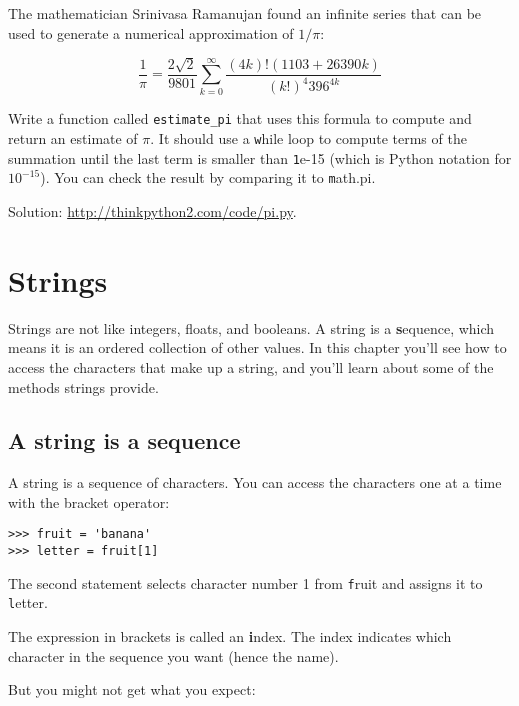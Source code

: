 \documentclass[
DIV=11,
fontsize=12,
twoside,
headinclude=false,
titlepage=firstiscover,
abstract=true,
headsepline=true,
footsepline=true,
chapterprefix=true, %
headings=big,
bibliography=totoc,%
captions=tableheading
]{scrbook}
\theoremstyle{definition}
\begin{document}
\begin{exercise}
\normalfont
{}

The mathematician Srinivasa Ramanujan found an
infinite series
that can be used to generate a numerical
approximation of $1 / \pi$:

\[ \frac{1}{\pi} = \frac{2\sqrt{2}}{9801} 
\sum^\infty_{k=0} \frac{(4k)!(1103+26390k)}{(k!)^4 396^{4k}} \]

Write a function called \verb"estimate_pi" that uses this formula
to compute and return an estimate of $\pi$.  It should use a {\texttt while}
loop to compute terms of the summation until the last term is
smaller than {\texttt 1e-15} (which is Python notation for $10^{-15}$).
You can check the result by comparing it to {\texttt math.pi}.

Solution: \url{http://thinkpython2.com/code/pi.py}.

\end{exercise}


\chapter{Strings}
\label{strings}

Strings are not like integers, floats, and booleans.  A string
is a {\textbf sequence}, which means it is
an ordered collection of other values.  In this chapter you'll see
how to access the characters that make up a string, and you'll
learn about some of the methods strings provide.


\section{A string is a sequence}

A string is a sequence of characters.  
You can access the characters one at a time with the
bracket operator:

\begin{lstlisting}
>>> fruit = 'banana'
>>> letter = fruit[1]
\end{lstlisting}
%
The second statement selects character number 1 from {\texttt
fruit} and assigns it to {\texttt letter}.  

The expression in brackets is called an {\textbf index}.  
The index indicates which character in the sequence you
want (hence the name).

But you might not get what you expect:
\end{document}
